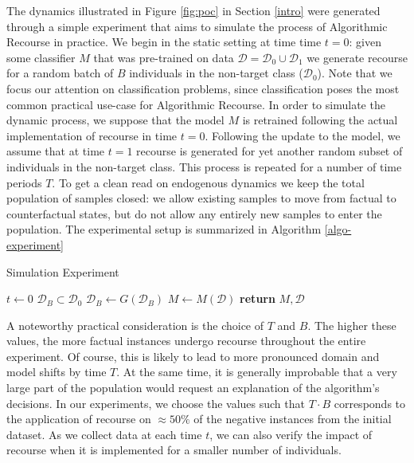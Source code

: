 \documentclass[conference,final,]{IEEEtran}
\theoremstyle{definition}
\theoremstyle{definition}
\theoremstyle{definition}
\theoremstyle{definition}
\theoremstyle{remark}
\begin{document}
The dynamics illustrated in Figure \ref{fig:poc} in Section \ref{intro} were generated through a simple experiment that aims to simulate the process of Algorithmic Recourse in practice. We begin in the static setting at time time \(t=0\): given some classifier \(M\) that was pre-trained on data \(\mathcal{D}=\mathcal{D}_0 \cup \mathcal{D}_1\) we generate recourse for a random batch of \(B\) individuals in the non-target class (\(\mathcal{D}_0\)). Note that we focus our attention on classification problems, since classification poses the most common practical use-case for Algorithmic Recourse. In order to simulate the dynamic process, we suppose that the model \(M\) is retrained following the actual implementation of recourse in time \(t=0\). Following the update to the model, we assume that at time \(t=1\) recourse is generated for yet another random subset of individuals in the non-target class. This process is repeated for a number of time periods \(T\). To get a clean read on endogenous dynamics we keep the total population of samples closed: we allow existing samples to move from factual to counterfactual states, but do not allow any entirely new samples to enter the population. The experimental setup is summarized in Algorithm \ref{algo-experiment}

\begin{algorithm}
\caption{Simulation Experiment}\label{algo-experiment}
\begin{algorithmic}[1]
\State $t\gets 0$
\State $\mathcal{D}_B \subset \mathcal{D}_0$ 
\State $\mathcal{D}_B\gets G(\mathcal{D}_B)$ 
\State $M\gets M(\mathcal{D})$ 
\EndWhile
\State \textbf{return} $M,\mathcal{D}$
\EndProcedure
\end{algorithmic}
\end{algorithm}

A noteworthy practical consideration is the choice of \(T\) and \(B\). The higher these values, the more factual instances undergo recourse throughout the entire experiment. Of course, this is likely to lead to more pronounced domain and model shifts by time \(T\). At the same time, it is generally improbable that a very large part of the population would request an explanation of the algorithm's decisions. In our experiments, we choose the values such that \(T \cdot B\) corresponds to the application of recourse on \(\approx50\%\) of the negative instances from the initial dataset. As we collect data at each time \(t\), we can also verify the impact of recourse when it is implemented for a smaller number of individuals.
\end{document}
